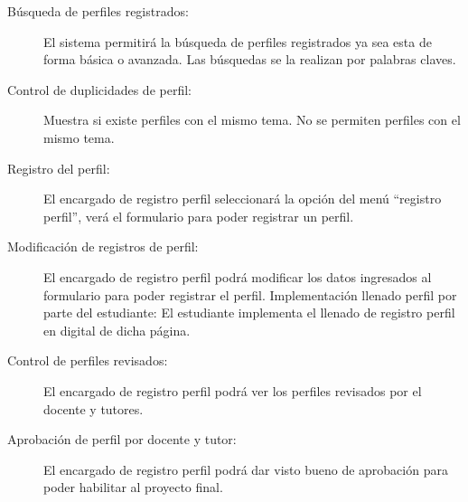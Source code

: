 \documentclass[10pt,letterpaper,twoside]{article}
\begin{document}
\begin{multicols}{2}
\begin{description}
    \item [Búsqueda de perfiles registrados:] El sistema permitirá la búsqueda de perfiles registrados ya sea esta de forma básica o avanzada. Las búsquedas se la realizan por palabras claves.
    \item [Control de duplicidades de perfil:] Muestra si existe perfiles con el mismo tema. No se permiten perfiles con el mismo tema.
    \item [Registro del perfil:] El encargado de registro perfil seleccionará la opción del menú “registro perfil”, verá el formulario para poder registrar un perfil.
    \item [Modificación de registros de perfil:] El encargado de registro perfil podrá modificar los datos ingresados al formulario para poder registrar el perfil. Implementación llenado perfil por parte del estudiante: El estudiante implementa el llenado de registro perfil en digital de dicha página.
    \item [Control de perfiles revisados:] El encargado de registro perfil podrá ver los perfiles revisados por el docente y tutores.
    \item [Aprobación de perfil por docente y tutor:] El encargado de registro perfil podrá dar visto bueno de aprobación para poder habilitar al proyecto final.
\end{description}


\end{multicols}
\end{document}
